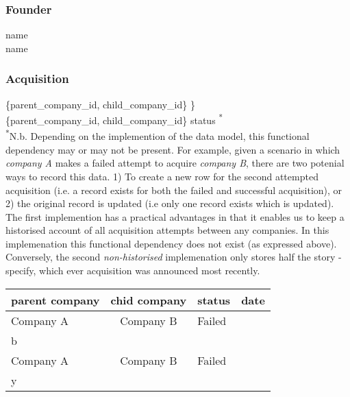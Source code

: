 \documentclass[12pt]{article}
\begin{document}
\subsubsection{Founder}
name  \\
name 

\subsubsection{Acquisition}
\{parent\_company\_id, child\_company\_id\} \} \\
 \{parent\_company\_id, child\_company\_id\} \not \Rightarrow status \textsuperscript{*} \\

\textsuperscript{*}N.b. Depending on the implemention of the data model, this functional dependency may or may not be present. For example, given a scenario in which \emph{company A} makes a failed attempt to acquire \emph{company B}, there are two potenial ways to record this data. 1) To create a new row for the second attempted acquisition (i.e. a record exists for both the failed and successful acquisition), or 2) the original record is updated (i.e only one record exists which is updated). The first implemention has a practical advantages in that it enables us to keep a historised account of all acquisition attempts between any companies. In this implemenation this functional dependency does not exist (as expressed above). Conversely, the second \textit{non-historised} implemenation only stores half the story - specify, which ever acquisition was announced most recently.

\begin{tabular}{l|c|l|r}
parent company&chid company&status&date\\\hline
Company A&Company B&Failed\\b\\
Company A&Company B&Failed\\y\\
\end{tabular}
\end{document}
